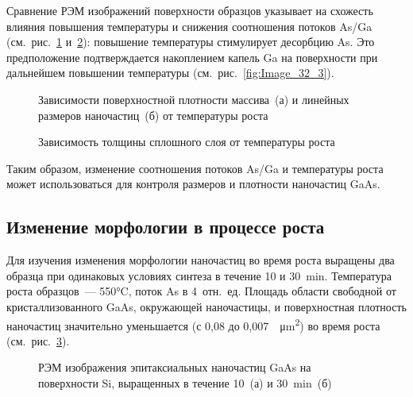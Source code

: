 Сравнение РЭМ изображений поверхности образцов указывает на схожесть влияния
повышения температуры и снижения соотношения потоков As/Ga
(см.~рис.~\cref{fig:tab_3} и~\cref{fig:tab_3_3}): повышение температуры
стимулирует десорбцию As. Это предположение подтверждается накоплением капель
Ga на поверхности при дальнейшем повышении температуры
(см.~рис.~\cref{fig:Image_32_3}).

\begin{figure}[ht]   \caption{Зависимости
			поверхностной плотности массива~(а) и линейных размеров наночастиц~(б) от
	температуры роста}\label{fig:tab_3} \end{figure}

\begin{figure}[ht]   \caption{Зависимость
		толщины сплошного слоя от температуры роста}\label{fig:tab_3_3}
	\end{figure}

Таким образом, изменение соотношения потоков As/Ga и температуры роста может
использоваться для контроля размеров и плотности наночастиц GaAs.

\subsection{Изменение морфологии в процессе роста}\label{subsec:ch5/sec2/sub2}

Для изучения изменения морфологии наночастиц во время роста выращены два
образца при одинаковых условиях синтеза в течение 10 и 30~\si{\minute}.
Температура роста образцов~--- 550°C, поток As в 4~отн.~ед. Площадь области
свободной от кристаллизованного GaAs, окружающей наночастицы, и поверхностная
плотность наночастиц значительно уменьшается (с 0,08 до
0,007~\si{\per\micro\metre\squared}) во время роста
(см.~рис.~\cref{fig:Image_33}).

\begin{figure}[ht]  
			\caption{РЭМ изображения эпитаксиальных наночастиц GaAs на поверхности
				Si, выращенных в течение 10~(а) и
		30~\si{\minute}~(б)}\label{fig:Image_33} \end{figure}

